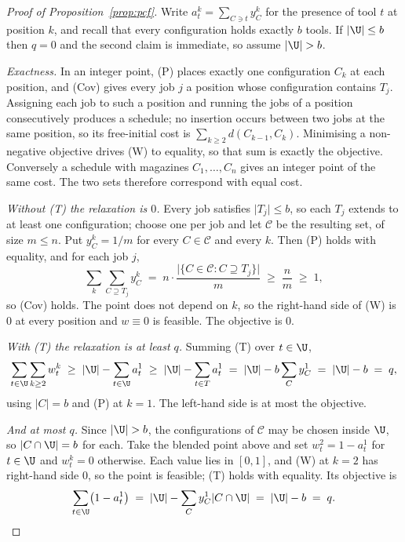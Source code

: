 \begin{proof}[Proof of Proposition~\ref{prop:pcf}]
Write $a_t^{k}=\sum_{C\ni t}y_C^{k}$ for the presence of tool $t$ at position $k$, and
recall that every configuration holds exactly $b$ tools. If $\lvert\U\rvert\le b$ then
$q=0$ and the second claim is immediate, so assume $\lvert\U\rvert>b$.

\emph{Exactness.} In an integer point, (P) places exactly one configuration $C_k$ at
each position, and (Cov) gives every job $j$ a position whose configuration contains
$T_j$. Assigning each job to such a position and running the jobs of a position
consecutively produces a schedule; no insertion occurs between two jobs at the same
position, so its free-initial cost is $\sum_{k\ge2}d(C_{k-1},C_k)$. Minimising a
non-negative objective drives (W) to equality, so that sum is exactly the objective.
Conversely a schedule with magazines $C_1,\dots,C_n$ gives an integer point of the same
cost. The two sets therefore correspond with equal cost.

\emph{Without (T) the relaxation is $0$.} Every job satisfies $\lvert T_j\rvert\le b$,
so each $T_j$ extends to at least one configuration; choose one per job and let
$\mathcal{C}$ be the resulting set, of size $m\le n$. Put $y_C^{k}=1/m$ for every
$C\in\mathcal{C}$ and every $k$. Then (P) holds with equality, and for each job $j$,
\[
  \sum_{k}\sum_{C\supseteq T_j}y_C^{k}\;=\;n\cdot\frac{\lvert\{C\in\mathcal{C}:C\supseteq T_j\}\rvert}{m}\;\ge\;\frac{n}{m}\;\ge\;1,
\]
so (Cov) holds. The point does not depend on $k$, so the right-hand side of (W) is $0$
at every position and $w\equiv0$ is feasible. The objective is $0$.

\emph{With (T) the relaxation is at least $q$.} Summing (T) over $t\in\U$,
\[
  \sum_{t\in\U}\sum_{k\ge2}w_t^{k}\;\ge\;\lvert\U\rvert-\sum_{t\in\U}a_t^{1}
  \;\ge\;\lvert\U\rvert-\sum_{t\in T}a_t^{1}
  \;=\;\lvert\U\rvert-b\sum_{C}y_C^{1}\;=\;\lvert\U\rvert-b\;=\;q,
\]
using $\lvert C\rvert=b$ and (P) at $k=1$. The left-hand side is at most the objective.

\emph{And at most $q$.} Since $\lvert\U\rvert>b$, the configurations of $\mathcal{C}$
may be chosen inside $\U$, so $\lvert C\cap\U\rvert=b$ for each. Take the blended point
above and set $w_t^{2}=1-a_t^{1}$ for $t\in\U$ and $w_t^{k}=0$ otherwise. Each value
lies in $[0,1]$, and (W) at $k=2$ has right-hand side $0$, so the point is feasible;
(T) holds with equality. Its objective is
\[
  \sum_{t\in\U}\bigl(1-a_t^{1}\bigr)
  \;=\;\lvert\U\rvert-\sum_{C}y_C^{1}\lvert C\cap\U\rvert
  \;=\;\lvert\U\rvert-b\;=\;q. \qedhere
\]
\end{proof}

